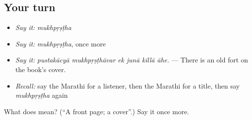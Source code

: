 \subsection*{Your turn}
\begin{itemize}
\raggedright
  \item \emph{Say it:} \emph{mukhpṛṣṭha}
  \item \emph{Say it:} \emph{mukhpṛṣṭha}, once more
  \item \emph{Say it:} \emph{pustakācyā mukhpṛṣṭhāvar ek junā killā āhe.} — There is an old fort on the book's cover.
  \item \emph{Recall:} say the Marathi for a listener, then the Marathi for a title, then say \emph{mukhpṛṣṭha} again
\end{itemize}

\begin{tcolorbox}[breakable,colback=teal!4,colframe=teal!35!black,title={Before you move on}]
What does  mean? (\textquotedblleft{}A front page; a cover\textquotedblright{}.) Say it once more.
\end{tcolorbox}
